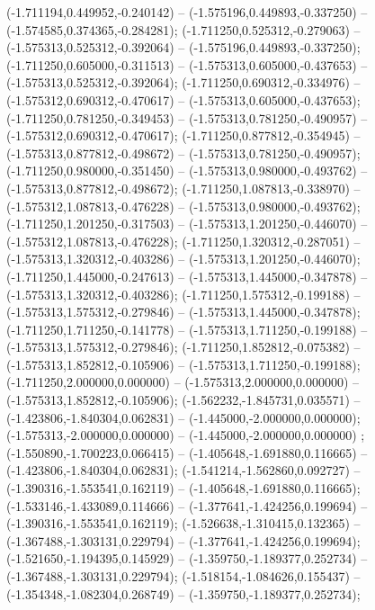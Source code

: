  (-1.711194,0.449952,-0.240142) -- (-1.575196,0.449893,-0.337250) -- (-1.574585,0.374365,-0.284281);
 (-1.711250,0.525312,-0.279063) -- (-1.575313,0.525312,-0.392064) -- (-1.575196,0.449893,-0.337250);
 (-1.711250,0.605000,-0.311513) -- (-1.575313,0.605000,-0.437653) -- (-1.575313,0.525312,-0.392064);
 (-1.711250,0.690312,-0.334976) -- (-1.575312,0.690312,-0.470617) -- (-1.575313,0.605000,-0.437653);
 (-1.711250,0.781250,-0.349453) -- (-1.575313,0.781250,-0.490957) -- (-1.575312,0.690312,-0.470617);
 (-1.711250,0.877812,-0.354945) -- (-1.575313,0.877812,-0.498672) -- (-1.575313,0.781250,-0.490957);
 (-1.711250,0.980000,-0.351450) -- (-1.575313,0.980000,-0.493762) -- (-1.575313,0.877812,-0.498672);
 (-1.711250,1.087813,-0.338970) -- (-1.575312,1.087813,-0.476228) -- (-1.575313,0.980000,-0.493762);
 (-1.711250,1.201250,-0.317503) -- (-1.575313,1.201250,-0.446070) -- (-1.575312,1.087813,-0.476228);
 (-1.711250,1.320312,-0.287051) -- (-1.575313,1.320312,-0.403286) -- (-1.575313,1.201250,-0.446070);
 (-1.711250,1.445000,-0.247613) -- (-1.575313,1.445000,-0.347878) -- (-1.575313,1.320312,-0.403286);
 (-1.711250,1.575312,-0.199188) -- (-1.575313,1.575312,-0.279846) -- (-1.575313,1.445000,-0.347878);
 (-1.711250,1.711250,-0.141778) -- (-1.575313,1.711250,-0.199188) -- (-1.575313,1.575312,-0.279846);
 (-1.711250,1.852812,-0.075382) -- (-1.575313,1.852812,-0.105906) -- (-1.575313,1.711250,-0.199188);
 (-1.711250,2.000000,0.000000) -- (-1.575313,2.000000,0.000000) -- (-1.575313,1.852812,-0.105906);
 (-1.562232,-1.845731,0.035571) -- (-1.423806,-1.840304,0.062831) -- (-1.445000,-2.000000,0.000000);
 (-1.575313,-2.000000,0.000000) -- (-1.445000,-2.000000,0.000000) ;
 (-1.550890,-1.700223,0.066415) -- (-1.405648,-1.691880,0.116665) -- (-1.423806,-1.840304,0.062831);
 (-1.541214,-1.562860,0.092727) -- (-1.390316,-1.553541,0.162119) -- (-1.405648,-1.691880,0.116665);
 (-1.533146,-1.433089,0.114666) -- (-1.377641,-1.424256,0.199694) -- (-1.390316,-1.553541,0.162119);
 (-1.526638,-1.310415,0.132365) -- (-1.367488,-1.303131,0.229794) -- (-1.377641,-1.424256,0.199694);
 (-1.521650,-1.194395,0.145929) -- (-1.359750,-1.189377,0.252734) -- (-1.367488,-1.303131,0.229794);
 (-1.518154,-1.084626,0.155437) -- (-1.354348,-1.082304,0.268749) -- (-1.359750,-1.189377,0.252734);
